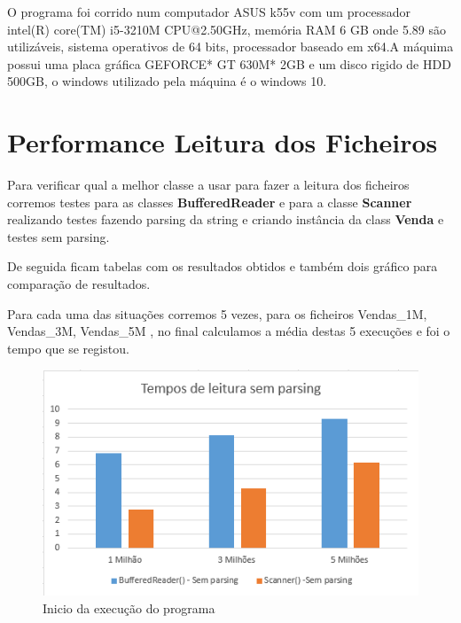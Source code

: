 O programa foi corrido num computador ASUS k55v com um processador intel(R) core(TM) i5-3210M CPU@2.50GHz, memória RAM 6 GB onde 5.89 são utilizáveis, sistema operativos de 64 bits, processador baseado em x64.A máquima possui uma placa gráfica GEFORCE* GT 630M* 2GB e um disco rigido de HDD 500GB, o windows utilizado pela máquina é o windows 10. 

 
\section{Performance Leitura dos Ficheiros}

\par Para verificar qual a melhor classe a usar para fazer a leitura dos ficheiros corremos testes para as classes
\color{blue} \textbf{BufferedReader} \color{black} e para a classe \color{blue} \textbf{Scanner} \color{black} realizando testes
fazendo parsing da string e criando instância da class \color{blue} \textbf{Venda} \color{black} e testes sem parsing.
\par De seguida ficam tabelas com os resultados obtidos e também dois gráfico para comparação de resultados.

Para cada uma das situações corremos 5 vezes, para os ficheiros Vendas\_1M, Vendas\_3M, Vendas\_5M , no final calculamos a média destas 5 execuções e foi o tempo que se registou.

\begin{figure}[h!]
	\includegraphics[scale=1]{graficosemparsing}  
	\caption{Inicio da execução do programa }  
\end{figure}

